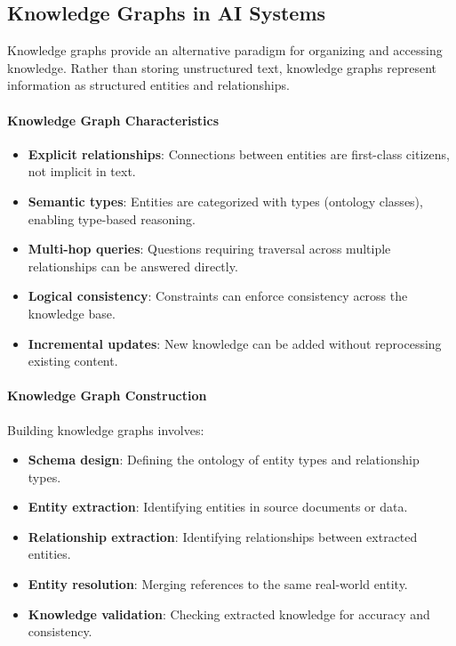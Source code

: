 \documentclass[a4paper,twoside]{sapthesis}
\begin{document}
\subsection{Knowledge Graphs in AI Systems}

Knowledge graphs provide an alternative paradigm for organizing and accessing knowledge. Rather than storing unstructured text, knowledge graphs represent information as structured entities and relationships.

\paragraph{Knowledge Graph Characteristics}

\begin{itemize}
    \item \textbf{Explicit relationships}: Connections between entities are first-class citizens, not implicit in text.
    
    \item \textbf{Semantic types}: Entities are categorized with types (ontology classes), enabling type-based reasoning.
    
    \item \textbf{Multi-hop queries}: Questions requiring traversal across multiple relationships can be answered directly.
    
    \item \textbf{Logical consistency}: Constraints can enforce consistency across the knowledge base.
    
    \item \textbf{Incremental updates}: New knowledge can be added without reprocessing existing content.
\end{itemize}

\paragraph{Knowledge Graph Construction}

Building knowledge graphs involves:

\begin{itemize}
    \item \textbf{Schema design}: Defining the ontology of entity types and relationship types.
    
    \item \textbf{Entity extraction}: Identifying entities in source documents or data.
    
    \item \textbf{Relationship extraction}: Identifying relationships between extracted entities.
    
    \item \textbf{Entity resolution}: Merging references to the same real-world entity.
    
    \item \textbf{Knowledge validation}: Checking extracted knowledge for accuracy and consistency.
\end{itemize}
\end{document}
